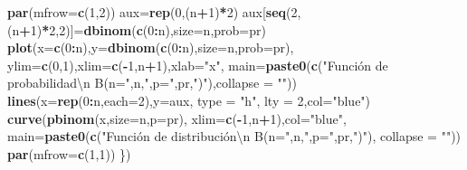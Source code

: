 \documentclass[]{book}
\newenvironment{Shaded}{\begin{snugshade}}{\end{snugshade}}
\newcommand{\CharTok}[1]{\textcolor[rgb]{0.31,0.60,0.02}{#1}}
\newcommand{\DataTypeTok}[1]{\textcolor[rgb]{0.13,0.29,0.53}{#1}}
\newcommand{\DecValTok}[1]{\textcolor[rgb]{0.00,0.00,0.81}{#1}}
\newcommand{\KeywordTok}[1]{\textcolor[rgb]{0.13,0.29,0.53}{\textbf{#1}}}
\newcommand{\NormalTok}[1]{#1}
\newcommand{\OperatorTok}[1]{\textcolor[rgb]{0.81,0.36,0.00}{\textbf{#1}}}
\newcommand{\StringTok}[1]{\textcolor[rgb]{0.31,0.60,0.02}{#1}}
\begin{document}
\begin{Shaded}
\begin{Highlighting}[]
  \KeywordTok{par}\NormalTok{(}\DataTypeTok{mfrow=}\KeywordTok{c}\NormalTok{(}\DecValTok{1}\NormalTok{,}\DecValTok{2}\NormalTok{))}
\NormalTok{  aux=}\KeywordTok{rep}\NormalTok{(}\DecValTok{0}\NormalTok{,(n}\OperatorTok{+}\DecValTok{1}\NormalTok{)}\OperatorTok{*}\DecValTok{2}\NormalTok{)}
\NormalTok{  aux[}\KeywordTok{seq}\NormalTok{(}\DecValTok{2}\NormalTok{,(n}\OperatorTok{+}\DecValTok{1}\NormalTok{)}\OperatorTok{*}\DecValTok{2}\NormalTok{,}\DecValTok{2}\NormalTok{)]=}\KeywordTok{dbinom}\NormalTok{(}\KeywordTok{c}\NormalTok{(}\DecValTok{0}\OperatorTok{:}\NormalTok{n),}\DataTypeTok{size=}\NormalTok{n,}\DataTypeTok{prob=}\NormalTok{pr)}
  \KeywordTok{plot}\NormalTok{(}\DataTypeTok{x=}\KeywordTok{c}\NormalTok{(}\DecValTok{0}\OperatorTok{:}\NormalTok{n),}\DataTypeTok{y=}\KeywordTok{dbinom}\NormalTok{(}\KeywordTok{c}\NormalTok{(}\DecValTok{0}\OperatorTok{:}\NormalTok{n),}\DataTypeTok{size=}\NormalTok{n,}\DataTypeTok{prob=}\NormalTok{pr),}
       \DataTypeTok{ylim=}\KeywordTok{c}\NormalTok{(}\DecValTok{0}\NormalTok{,}\DecValTok{1}\NormalTok{),}\DataTypeTok{xlim=}\KeywordTok{c}\NormalTok{(}\OperatorTok{-}\DecValTok{1}\NormalTok{,n}\OperatorTok{+}\DecValTok{1}\NormalTok{),}\DataTypeTok{xlab=}\StringTok{"x"}\NormalTok{,}
       \DataTypeTok{main=}\KeywordTok{paste0}\NormalTok{(}\KeywordTok{c}\NormalTok{(}\StringTok{"Función de probabilidad}\CharTok{\textbackslash{}n}\StringTok{ B(n="}\NormalTok{,n,}\StringTok{",p="}\NormalTok{,pr,}\StringTok{")"}\NormalTok{),}\DataTypeTok{collapse =} \StringTok{""}\NormalTok{))}
  \KeywordTok{lines}\NormalTok{(}\DataTypeTok{x=}\KeywordTok{rep}\NormalTok{(}\DecValTok{0}\OperatorTok{:}\NormalTok{n,}\DataTypeTok{each=}\DecValTok{2}\NormalTok{),}\DataTypeTok{y=}\NormalTok{aux, }\DataTypeTok{type =} \StringTok{"h"}\NormalTok{, }\DataTypeTok{lty =} \DecValTok{2}\NormalTok{,}\DataTypeTok{col=}\StringTok{"blue"}\NormalTok{)}
  \KeywordTok{curve}\NormalTok{(}\KeywordTok{pbinom}\NormalTok{(x,}\DataTypeTok{size=}\NormalTok{n,}\DataTypeTok{p=}\NormalTok{pr),}
        \DataTypeTok{xlim=}\KeywordTok{c}\NormalTok{(}\OperatorTok{-}\DecValTok{1}\NormalTok{,n}\OperatorTok{+}\DecValTok{1}\NormalTok{),}\DataTypeTok{col=}\StringTok{"blue"}\NormalTok{,}
        \DataTypeTok{main=}\KeywordTok{paste0}\NormalTok{(}\KeywordTok{c}\NormalTok{(}\StringTok{"Función de distribución\textbackslash{}n B(n="}\NormalTok{,n,}\StringTok{",p="}\NormalTok{,pr,}\StringTok{")"}\NormalTok{),}
                    \DataTypeTok{collapse =} \StringTok{""}\NormalTok{))}
        \KeywordTok{par}\NormalTok{(}\DataTypeTok{mfrow=}\KeywordTok{c}\NormalTok{(}\DecValTok{1}\NormalTok{,}\DecValTok{1}\NormalTok{))}
\NormalTok{\})}
\end{Highlighting}
\end{Shaded}
\end{document}

